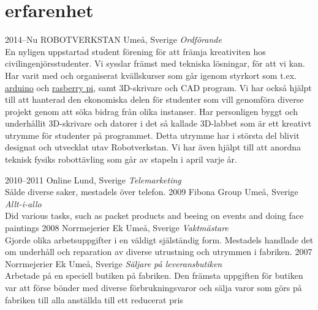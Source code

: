 \documentclass[]{friggeri-cv} %
\begin{document}

\section{erfarenhet}

\begin{entrylist}
\entry
{2014--Nu}
{ROBOTVERKSTAN}
{Umeå, Sverige}
{\emph{Ordförande} \\
En nyligen uppstartad student förening för att främja kreativiten hos civilingenjörsstudenter. Vi sysslar främst med tekniska lösningar, för att vi kan. Har varit med och organiserat kvällskurser som går igenom styrkort som t.ex. \href{http://http://www.arduino.cc/}{arduino} och \href{http://www.raspberrypi.org/}{rasberry pi}, samt 3D-skrivare och CAD program. Vi har också hjälpt till att hanterad den ekonomiska delen för studenter som vill genomföra diverse projekt genom att söka bidrag från olika instanser. Har personligen byggt och underhållit 3D-skrivare och datorer i det så kallade 3D-labbet som är ett kreativt utrymme för studenter på programmet. Detta utrymme har i största del blivit designat och utvecklat utav Robotverkstan. Vi har även hjälpt till att anordna teknisk fysiks robottävling som går av stapeln i april varje år.}

\entry
{2010--2011}
{Online}
{Lund, Sverige}
{\emph{Telemarketing} \\
Sålde diverse saker, mestadels över telefon.}
\entry
{2009}
{Fibona Group}
{Umeå, Sverige}
{\emph{Allt-i-allo} \\
Did various tasks, such as packet products and beeing on events and doing face paintings}
\entry
{2008}
{Norrmejerier Ek}
{Umeå, Sverige}
{\emph{Vaktmästare} \\
Gjorde olika arbetsuppgifter i en väldigt själständig form. Mestadels handlade det om underhåll och reparation av diverse utrustning och utrymmen i fabriken.}
\entry
{2007}
{Norrmejerier Ek}
{Umeå, Sverige}
{\emph{Säljare på leveransbutiken} \\
Arbetade på en speciell butiken på fabriken. Den främsta uppgiften för butiken var att förse bönder med diverse förbrukningsvaror och sälja varor som görs på fabriken till alla anställda till ett reducerat pris}
\end{entrylist}
\end{document}
